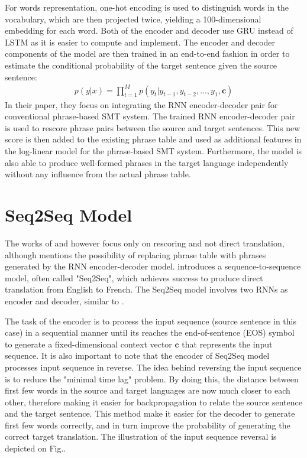 \documentclass[12pt]{extarticle}
\begin{document}
For words representation, one-hot encoding is used to distinguish words in the vocabulary, which are then projected twice, yielding a 100-dimensional embedding for each word.
Both of the encoder and decoder use GRU instead of LSTM as it is easier to compute and implement. The encoder and decoder components of the model are then trained in an end-to-end fashion in order to estimate the conditional probability of the target sentence given the source sentence: 
\begin{align}
p(y|x) = \prod_{t=1}^{M} p(y_{t} | y_{t-1}, y_{t-2},...,y_{1}, \textbf{c}) \label{eq:19}
\end{align}
In their paper, they focus on integrating the RNN encoder-decoder pair for conventional phrase-based SMT system. The trained RNN encoder-decoder pair is used to rescore phrase pairs between the source and target sentences. This new score is then added to the existing phrase table and used as additional features in the log-linear model for the phrase-based SMT system. Furthermore, the model is also able to produce well-formed phrases in the target language independently without any influence from the actual phrase table.


\section*{Seq2Seq Model}
The works of \citep{kalchbrenner-blunsom-2013-recurrent-continuous} and \citep{cho-etal-2014-learning} however focus only on rescoring and not direct translation, although \citep{cho-etal-2014-learning} mentions the possibility of replacing phrase table with phrases generated by the RNN encoder-decoder model. \citep{Sutskever:2014:SSL:2969033.2969173} introduces a sequence-to-sequence model, often called "Seq2Seq", which achieves success to produce direct translation from English to French. The Seq2Seq model involves two RNNs as encoder and decoder, similar to \citep{cho-etal-2014-learning}.


The task of the encoder is to process the input sequence (source sentence in this case) in a sequential manner until its reaches the end-of-sentence (EOS) symbol to generate a fixed-dimensional context vector $\textbf{c}$ that represents the input sequence. It is also important to note that the encoder of Seq2Seq model processes input sequence in reverse. The idea behind reversing the input sequence is to reduce the "minimal time lag" \citep{Hochreiter:1996:LSH:2998981.2999048} problem. By doing this, the distance between first few words in the source and target languages are now much closer to each other, therefore making it easier for backpropagation to relate the source sentence and the target sentence. This method make it easier for the decoder to generate first few words correctly, and in turn improve the probability of generating the correct target translation. The illustration of the input sequence reversal is depicted on Fig..%
\end{document}
